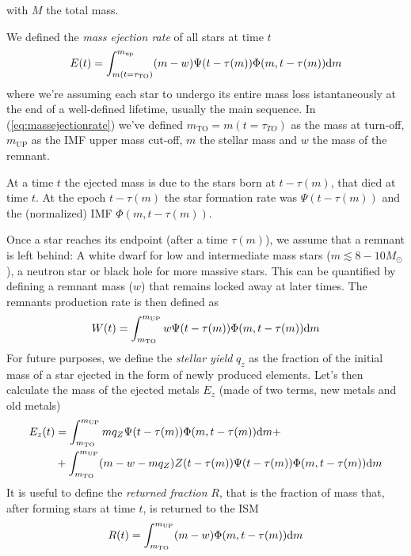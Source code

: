 with $M$ the total mass.
\par We defined the \emph{mass ejection rate} of all stars at time $t$
\begin{equation}
    E(t) = \int_{m(t=\tau_{\text{TO}})}^{m_{\text{up}}} (m-w)\Psi(t-\tau(m))\Phi(m, t-\tau(m))\text{d}m
    \label{eq:massejectionrate}
\end{equation}
where we're assuming each star to undergo its entire mass loss istantaneously at the end of a well-defined lifetime, usually the main sequence. In (\ref{eq:massejectionrate}) we've defined $m_{\text{TO}} = m(t=\tau_{TO})$ as the mass at turn-off, $m_{\text{UP}}$ as the IMF upper mass cut-off, $m$ the stellar mass and $w$ the mass of the remnant.
\par At a time $t$ the ejected mass is due to the stars born at $t-\tau(m)$, that died at time $t$. At the epoch $t-\tau(m)$ the star formation rate was $\Psi(t-\tau(m))$ and the (normalized) IMF $\Phi(m,t-\tau(m))$.
\par Once a star reaches its endpoint (after a time $\tau(m)$), we assume that a remnant is left behind: A white dwarf for low and intermediate mass stars ($m \lesssim 8-10M_{\odot}$), a neutron star or black hole for more massive stars. This can be quantified by defining a remnant mass ($w$) that remains locked away at later times. The remnants production rate is then defined as
\begin{equation}
    W(t) = \int_{m_{\text{TO}}}^{m_{\text{UP}}}w\Psi(t-\tau(m))\Phi(m, t-\tau(m))\text{d}m
    \label{eq:remnantsrate}
\end{equation}
For future purposes, we define the \emph{stellar yield} $q_{z}$ as the fraction of the initial mass of a star ejected in the form of newly produced elements. Let's then calculate the mass of the ejected metals $E_{z}$ (made of two terms, new metals and old metals)
\begin{align*}
    E_{z}(t) &= \int_{m_{\text{TO}}}^{m_{\text{UP}}} mq_{Z}\Psi(t-\tau(m))\Phi(m,t-\tau(m))\text{d}m +\\
    &+ \int_{m_{\text{TO}}}^{m_{\text{UP}}} (m-w-mq_{Z})Z(t-\tau(m))\Psi(t-\tau(m))\Phi(m,t-\tau(m))\text{d}m
\end{align*}
It is useful to define the \emph{returned fraction} $R$, that is the fraction of mass that, after forming stars at time $t$, is returned to the ISM
\begin{equation}
    R(t) = \int_{m_{\text{TO}}}^{m_{\text{UP}}} (m-w)\Phi(m,t-\tau(m))\text{d}m
    \label{eq:returnedfraction}
\end{equation}
